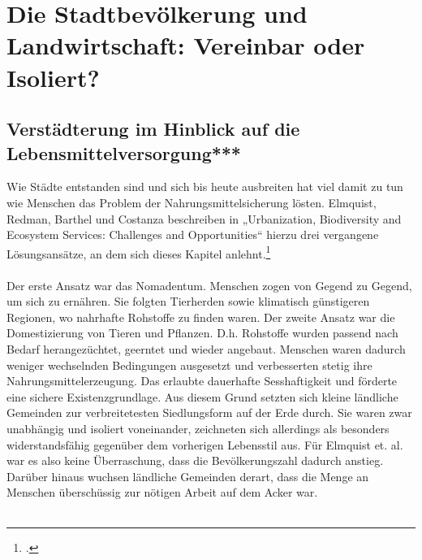 \documentclass{scrartcl}
\begin{document}
\FloatBarrier

\section{Die Stadtbevölkerung und Landwirtschaft: Vereinbar oder Isoliert?}
\subsection{Verstädterung im Hinblick auf die Lebensmittelversorgung***}
Wie Städte entstanden sind und sich bis heute ausbreiten hat viel damit zu tun wie Menschen das Problem der Nahrungsmittelsicherung lösten. Elmquist, Redman, Barthel und Costanza beschreiben in „Urbanization, Biodiversity and Ecosystem Services: Challenges and Opportunities“ hierzu drei vergangene Lösungsansätze, an dem sich dieses Kapitel anlehnt.\footcite[S.14ff]{Elmqvist2013} 
\\
\\ 
Der erste Ansatz war das Nomadentum. Menschen zogen von Gegend zu Gegend, um sich zu ernähren. Sie folgten Tierherden sowie klimatisch günstigeren Regionen, wo nahrhafte Rohstoffe zu finden waren. Der zweite Ansatz war die Domestizierung von Tieren und Pflanzen. D.h. Rohstoffe wurden passend nach Bedarf herangezüchtet, geerntet und wieder angebaut. Menschen waren dadurch weniger wechselnden Bedingungen ausgesetzt und verbesserten stetig ihre Nahrungsmittelerzeugung. Das erlaubte dauerhafte Sesshaftigkeit und förderte eine sichere Existenzgrundlage. Aus diesem Grund setzten sich kleine ländliche Gemeinden zur verbreitetesten Siedlungsform auf der Erde durch. Sie waren zwar unabhängig und isoliert voneinander, zeichneten sich allerdings als besonders widerstandsfähig gegenüber dem vorherigen Lebensstil aus. Für Elmquist et. al. war es also keine Überraschung, dass die Bevölkerungszahl dadurch anstieg. Darüber hinaus wuchsen ländliche Gemeinden derart, dass die Menge an Menschen überschüssig zur nötigen Arbeit auf dem Acker war. \\
\\
\end{document}
